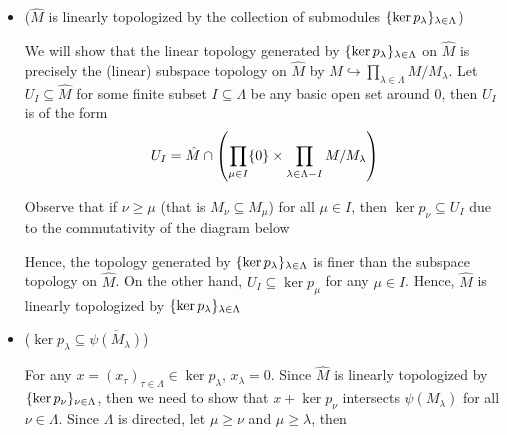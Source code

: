 \begin{longproof}
	
	\begin{itemize}
	\item ($\hat{M}$ is linearly topologized by the collection of submodules $\set{\ker p_\lambda}_{\lambda \in \Lambda}$)
	
	We will show that the linear topology generated by $\set{\ker p_\lambda}_{\lambda \in \Lambda}$ on $\hat{M}$ is precisely the (linear) subspace topology on $\hat{M}$ by $\hat{M} \hookrightarrow \prod_{\lambda \in \Lambda} M / M_\lambda$. Let $U_I \subseteq \hat{M}$ for some finite subset $I \subseteq \Lambda$ be any basic open set around $0$, then $U_I$ is of the form
	$$
		U_I = \hat{M} \cap \tuple*{\prod_{\mu \in I} \set{0} \times \prod_{\lambda \in \Lambda - I} M / M_\lambda}
	$$
	
	Observe that if $\nu \geq \mu$ (that is $M_\nu \subseteq M_\mu$) for all $\mu \in I$, then $\ker p_\nu \subseteq U_I$ due to the commutativity of the diagram below
	
	\begin{center}
	\end{center}
	
	Hence, the topology generated by $\set{\ker p_\lambda}_{\lambda \in \Lambda}$ is finer than the subspace topology on $\hat{M}$. On the other hand, $U_I \subseteq \ker p_\mu$ for any $\mu \in I$. Hence, $\hat{M}$ is linearly topologized by $\set{\ker p_\lambda}_{\lambda \in \Lambda}$
		
	\item ($\ker p_\lambda \subseteq \overline{\psi(M_\lambda)}$)
	
	For any $x = (x_\tau)_{\tau \in \Lambda} \in \ker p_\lambda$, $x_\lambda = 0$. Since $\hat{M}$ is linearly topologized by $\set{\ker p_\nu}_{\nu \in \Lambda}$, then we need to show that $x + \ker p_\nu$ intersects $\psi(M_\lambda)$ for all $\nu \in \Lambda$. Since $\Lambda$ is directed, let $\mu \geq \nu$ and $\mu \geq \lambda$, then
	

\end{itemize}
\end{longproof}
